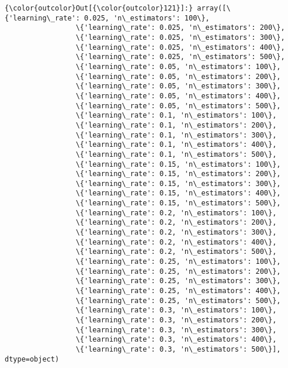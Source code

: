 \documentclass[11pt]{article}
\begin{document}
\begin{Verbatim}[commandchars=\\\{\}]
{\color{outcolor}Out[{\color{outcolor}121}]:} array([\{'learning\_rate': 0.025, 'n\_estimators': 100\},
                 \{'learning\_rate': 0.025, 'n\_estimators': 200\},
                 \{'learning\_rate': 0.025, 'n\_estimators': 300\},
                 \{'learning\_rate': 0.025, 'n\_estimators': 400\},
                 \{'learning\_rate': 0.025, 'n\_estimators': 500\},
                 \{'learning\_rate': 0.05, 'n\_estimators': 100\},
                 \{'learning\_rate': 0.05, 'n\_estimators': 200\},
                 \{'learning\_rate': 0.05, 'n\_estimators': 300\},
                 \{'learning\_rate': 0.05, 'n\_estimators': 400\},
                 \{'learning\_rate': 0.05, 'n\_estimators': 500\},
                 \{'learning\_rate': 0.1, 'n\_estimators': 100\},
                 \{'learning\_rate': 0.1, 'n\_estimators': 200\},
                 \{'learning\_rate': 0.1, 'n\_estimators': 300\},
                 \{'learning\_rate': 0.1, 'n\_estimators': 400\},
                 \{'learning\_rate': 0.1, 'n\_estimators': 500\},
                 \{'learning\_rate': 0.15, 'n\_estimators': 100\},
                 \{'learning\_rate': 0.15, 'n\_estimators': 200\},
                 \{'learning\_rate': 0.15, 'n\_estimators': 300\},
                 \{'learning\_rate': 0.15, 'n\_estimators': 400\},
                 \{'learning\_rate': 0.15, 'n\_estimators': 500\},
                 \{'learning\_rate': 0.2, 'n\_estimators': 100\},
                 \{'learning\_rate': 0.2, 'n\_estimators': 200\},
                 \{'learning\_rate': 0.2, 'n\_estimators': 300\},
                 \{'learning\_rate': 0.2, 'n\_estimators': 400\},
                 \{'learning\_rate': 0.2, 'n\_estimators': 500\},
                 \{'learning\_rate': 0.25, 'n\_estimators': 100\},
                 \{'learning\_rate': 0.25, 'n\_estimators': 200\},
                 \{'learning\_rate': 0.25, 'n\_estimators': 300\},
                 \{'learning\_rate': 0.25, 'n\_estimators': 400\},
                 \{'learning\_rate': 0.25, 'n\_estimators': 500\},
                 \{'learning\_rate': 0.3, 'n\_estimators': 100\},
                 \{'learning\_rate': 0.3, 'n\_estimators': 200\},
                 \{'learning\_rate': 0.3, 'n\_estimators': 300\},
                 \{'learning\_rate': 0.3, 'n\_estimators': 400\},
                 \{'learning\_rate': 0.3, 'n\_estimators': 500\}], dtype=object)
\end{Verbatim}
            
\end{document}
